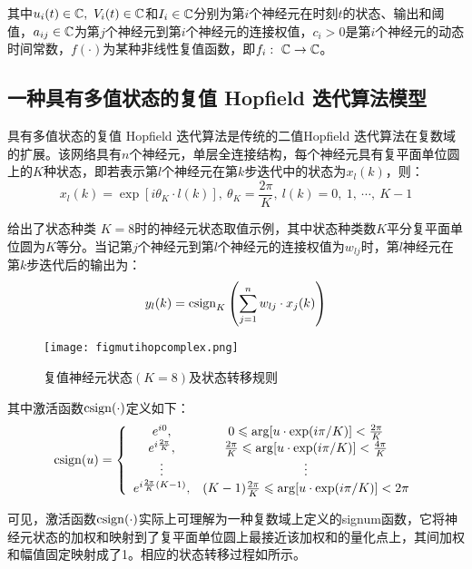 \documentclass{dmuthesis}
\begin{document}
其中$u_i(t)\in \mathbb{C},\ V_i(t)\in \mathbb{C}$和$I_i\in\mathbb{C}$分别为第$i$个神经元在时刻$t$的状态、输出和阈值，$a_{ij}\in\mathbb{C}$为第$j$个神经元到第$i$个神经元的连接权值，$c_i>0$是第$i$个神经元的动态时间常数，$f(\cdot)$为某种非线性复值函数，即$f_i:\ \mathbb{C}\rightarrow\mathbb{C}$。

\subsection{一种具有多值状态的复值 Hopf\/ield 迭代算法模型}
具有多值状态的复值 Hopf\/ield 迭代算法是传统的二值Hopf\/ield 迭代算法在复数域的扩展。该网络具有$n$个神经元，单层全连接结构，每个神经元具有复平面单位圆上的$K$种状态，即若表示第$l$个神经元在第$k$步迭代中的状态为$x_l(k)$，则：
\begin{equation}
x_l(k)=\exp[{i\theta_K\cdot l(k)}],\ \theta_K=\frac{2\pi}{K},\ l(k)=0,\ 1,\ \cdots,\ K-1
\end{equation}
 
 给出了状态种类 $K=8$时的神经元状态取值示例，其中状态种类数$K$平分复平面单位圆为$K$等分。当记第$j$个神经元到第$l$个神经元的连接权值为$w_{lj}$时，第$l$神经元在第$k$步迭代后的输出为：
\begin{equation}
y_l(k) = \operatorname{csign}_K\left(\sum\limits_{j=1}^n w_{lj}\cdot x_j(k)\right)
\label{eqiter}
\end{equation}
\begin{figure}[!htbp]
	\centering
	\texttt{[image: figmutihopcomplex.png]}
	\caption{复值神经元状态$(K=8)$及状态转移规则}
     \label{figmulti}
\end{figure}

其中激活函数$\operatorname{csign}(\cdot)$定义如下：
\begin{equation}
\operatorname{csign}(u)=
\left\{
\begin{array}{cc}
	e^{i0},&0\leqslant\arg[u\cdot\exp(i\pi/K)]<\frac{2\pi}{K}\\
	e^{i\frac{2\pi}{K}},&\frac{2\pi}{K}\leqslant\arg[u\cdot\exp(i\pi/K)]<\frac{4\pi}{K}\\
	\vdots&\vdots\\
	e^{i\frac{2\pi}{K}(K-1)},&(K-1)\frac{2\pi}{K}
	                                  \leqslant\arg[u\cdot\exp(i\pi/K)]<2\pi\\
\end{array}
\right.
\end{equation}

可见，激活函数$\operatorname{csign}(\cdot)$实际上可理解为一种复数域上定义的signum函数，它将神经元状态的加权和映射到了复平面单位圆上最接近该加权和的量化点上，其间加权和幅值固定映射成了1。相应的状态转移过程如所示。
\end{document}
